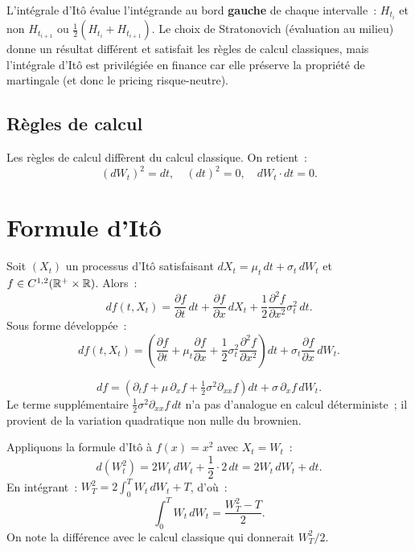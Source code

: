 \begin{attention}[title=\textbf{It\^o vs Stratonovich}]
L'int\'egrale d'It\^o \'evalue l'int\'egrande au bord \textbf{gauche}
de chaque intervalle~: $H_{t_i}$ et non $H_{t_{i+1}}$ ou
$\frac{1}{2}(H_{t_i} + H_{t_{i+1}})$. Le choix de Stratonovich
(\'evaluation au milieu) donne un r\'esultat diff\'erent et satisfait
les r\`egles de calcul classiques, mais l'int\'egrale d'It\^o est
privil\'egi\'ee en finance car elle pr\'eserve la propri\'et\'e de
martingale (et donc le pricing risque-neutre).
\end{attention}

\subsection{R\`egles de calcul}

Les r\`egles de calcul diff\`erent du calcul classique. On retient~:
\[
    (dW_t)^2 = dt, \quad (dt)^2 = 0, \quad dW_t \cdot dt = 0.
\]

\section{Formule d'It\^o}

\begin{theoreme}
\label{thm:ito_formula}
Soit $(X_t)$ un processus d'It\^o satisfaisant
$dX_t = \mu_t\,dt + \sigma_t\,dW_t$
et $f \in C^{1,2}(\mathbb{R}^+ \times \mathbb{R})$. Alors~:
\[
    df(t, X_t) = \frac{\partial f}{\partial t}\,dt
    + \frac{\partial f}{\partial x}\,dX_t
    + \frac{1}{2}\frac{\partial^2 f}{\partial x^2}\sigma_t^2\,dt.
\]
Sous forme d\'evelopp\'ee~:
\[
    df(t, X_t) = \left(\frac{\partial f}{\partial t}
    + \mu_t\frac{\partial f}{\partial x}
    + \frac{1}{2}\sigma_t^2\frac{\partial^2 f}{\partial x^2}\right)dt
    + \sigma_t\frac{\partial f}{\partial x}\,dW_t.
\]
\end{theoreme}

\begin{formules}[title=\textbf{Formule d'It\^o --- forme compacte}]
\[
    df = \left(\partial_t f + \mu\,\partial_x f
    + \tfrac{1}{2}\sigma^2\partial_{xx} f\right)dt
    + \sigma\,\partial_x f\,dW_t.
\]
Le terme suppl\'ementaire $\frac{1}{2}\sigma^2\partial_{xx}f\,dt$
n'a pas d'analogue en calcul d\'eterministe~; il provient de la
variation quadratique non nulle du brownien.
\end{formules}

\begin{exemple}
Appliquons la formule d'It\^o \`a $f(x) = x^2$ avec $X_t = W_t$~:
\[
    d(W_t^2) = 2W_t\,dW_t + \frac{1}{2}\cdot 2\,dt = 2W_t\,dW_t + dt.
\]
En int\'egrant~: $W_T^2 = 2\int_0^T W_t\,dW_t + T$, d'o\`u~:
\[
    \int_0^T W_t\,dW_t = \frac{W_T^2 - T}{2}.
\]
On note la diff\'erence avec le calcul classique qui donnerait $W_T^2/2$.
\end{exemple}

